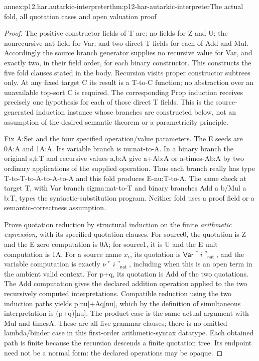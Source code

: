 \begin{annexitem}{annex:p12.har.autarkic-interpreter}{thm:p12-har-autarkic-interpreter}{The actual fold, all quotation cases and open valuation proof}
\begin{proof}
The positive constructor fields of T are: no fields for Z and U;
the nonrecursive nat field for Var; and two direct T fields for
each of Add and Mul. Accordingly the source branch generator supplies
no recursive value for Var, and exactly two, in their field order,
for each binary constructor. This constructs the five fold clauses
stated in the body. Recursion visits proper constructor subtrees only.
At any fixed target C its result is a T-to-C function; no abstraction
over an unavailable top-sort C is required. The corresponding Prop
induction receives precisely one hypothesis for each of those direct
T fields. This is the source-generated induction instance whose
branches are constructed below, not an assumption of the desired
semantic theorem or a parametricity principle.

Fix A:Set and the four specified operation/value parameters.
The E seeds are 0A:A and 1A:A. Its variable branch is
nu:nat-to-A. In a binary branch the original s,t:T and recursive
values a,b:A give a+Ab:A or a-times-Ab:A by two ordinary
applications of the supplied operation. Thus each branch really
has type T-to-T-to-A-to-A-to-A and this fold produces E-nu:T-to-A.
The same check at target T, with Var branch sigma:nat-to-T and
binary branches Add a b/Mul a b:T, types the syntactic-substitution
program. Neither fold uses a proof field or a semantic-correctness
assumption.

Prove quotation reduction by structural induction on the finite
\emph{arithmetic expression}, with its specified quotation clauses.
For source0, the quotation is Z and the E zero computation is 0A;
for source1, it is U and the E unit computation is 1A. For a source
name \(x_i\), its quotation is
\(\mathsf{Var}\ulcorner i\urcorner_{\mathsf{nat}}\), and the
variable computation is exactly
\(\nu\ulcorner i\urcorner_{\mathsf{nat}}\),
including when this is an open term in the ambient valid context.
For p+q, its quotation is Add of the two quotations. The Add
computation gives the declared addition operation applied to the
two recursively computed interpretations. Compatible reduction using
the two induction paths yields p[nu]+Aq[nu], which by the definition
of simultaneous interpretation is (p+q)[nu]. The product case is
the same actual argument with Mul and timesA. These are all five
grammar clauses; there is no omitted lambda/binder case in this
first-order arithmetic-syntax datatype. Each obtained path is finite
because the recursion descends a finite quotation tree. Its endpoint
need not be a normal form: the declared operations may be opaque.


\end{proof}
\end{annexitem}
